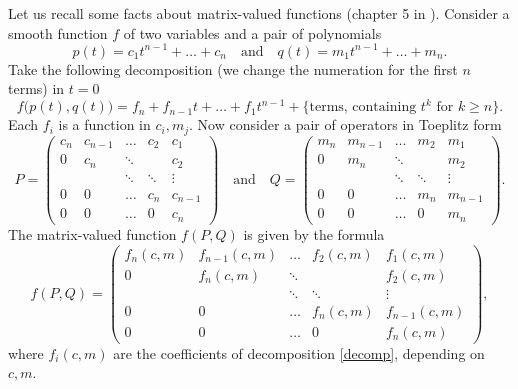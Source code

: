 \documentclass[12pt]{article}
\theoremstyle{remark}
\begin{document}
Let us recall some facts about matrix-valued functions (chapter 5 in \cite{gantmaher}). Consider a smooth function $f$ of two variables and a pair of polynomials
$$
p(t) = c_1 t^{n - 1} + \dots + c_n \quad \text{and} \quad q(t) = m_1 t^{n - 1} + \dots + m_n.
$$
Take the following decomposition (we change the numeration for the first $n$ terms) in $t = 0$
\begin{equation}\label{decomp}
f\big(p(t), q(t)\big) = f_{n} + f_{n - 1} t + \dots + f_1 t^{n - 1} + \{\text{terms, containing $t^k$ for $k \geq n$}\} .    
\end{equation}
Each $f_i$ is a function in $c_i, m_j$. Now consider a pair of operators in Toeplitz form
$$
P = \left( \begin{array}{ccccc}
     c_n & c_{n - 1} &\dots  & c_2 & c_1  \\
     0 & c_n & \ddots & & c_2 \\
     &  &\ddots & \ddots & \vdots\\
     0 & 0 & \dots & c_n & c_{n - 1} \\
     0 & 0 & \dots & 0 & c_n
\end{array}\right) \quad \text{and} \quad Q = \left( \begin{array}{ccccc}
     m_n & m_{n - 1} &\dots  & m_2 & m_1  \\
     0 & m_n & \ddots & & m_2 \\
     &  &\ddots & \ddots & \vdots\\
     0 & 0 & \dots & m_n & m_{n - 1} \\
     0 & 0 & \dots & 0 & m_n
\end{array}\right).
$$
The matrix-valued function $f(P, Q)$ is given by the formula
$$
f(P, Q) = \left( \begin{array}{ccccc}
     f_n(c, m) & f_{n - 1}(c, m) & \dots & f_2(c, m) & f_1 (c, m)  \\
     0 & f_n(c, m) & \ddots & & f_2(c, m) \\
     &  &\ddots & \ddots & \vdots\\
     0 & 0 & \dots & f_n(c, m) & f_{n - 1}(c, m) \\
     0 & 0 & \dots & 0 & f_n(c, m)
\end{array}\right),
$$
where $f_i(c, m)$ are the coefficients of decomposition \eqref{decomp}, depending on $c, m$. 
\end{document}
